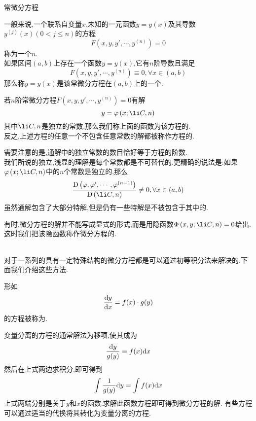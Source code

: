 \documentclass{ctexart}
\begin{document}
\pagestyle{empty}
\begin{center}\large 常微分方程\end{center}
\begin{definition}[1.1 定义:常微分方程]
    一般来说,一个联系自变量$x$,未知的一元函数$y=y(x)$及其导数$y^{(j)}(x)(0<j\leqslant n)$的方程
    \[F\left(x,y,y',\cdots,y^{(n)}\right)=0\]
    称为一个$n$.\\
    如果区间$(a,b)$上存在一个函数$y=y(x)$,它有$n$阶导数且满足
    \[F\left(x,y,y',\cdots,y^{(n)}\right)\equiv0,\forall x\in(a,b)\]
    那么称$y=y(x)$是该常微分方程在$(a,b)$上的一个.
\end{definition}
\begin{definition}[1.2 定义:通解与特解]
    若$n$阶常微分方程$F\left(x,y,y',\cdots,y^{(n)}\right)=0$有解
    \[y=\varphi\left(x;\li C,n\right)\]
    其中$\li C,n$是独立的常数,那么我们称上面的函数为该方程的.\\
    反之,上述方程的任意一个不包含任意常数的解都被称作方程的.
\end{definition}\noindent
需要注意的是,通解中的独立常数的数目恰好等于方程的阶数.\\
我们所说的独立,浅显的理解是每个常数都是不可替代的.更精确的说法是:如果$\varphi\left(x;\li C,n\right)$中的$n$个常数是独立的,那么
\[\dfrac{\text{D}\left(\varphi,\varphi',\cdots,\varphi^{(n-1)}\right)}{\text{D}\left(\li C,n\right)}\neq0,\forall x\in (a,b)\]
虽然通解包含了大部分特解,但是仍有一些特解是不被包含于其中的.
\begin{definition}[1.3 定义:通积分]
    有时,微分方程的解并不能写成显式的形式,而是用隐函数$\Phi\left(x,y;\li C,n\right)=0$给出.这时我们把该隐函数称作微分方程的.
\end{definition}\noindent
{}\\
对于一系列的具有一定特殊结构的微分方程都是可以通过初等积分法来解决的.下面我们介绍这些方法.
\begin{definition}[2.1 变量分离的方程]
    形如
    \[\dfrac{\mathrm{d} y}{\mathrm{d} x}=f(x)\cdot g(y)\]
    的方程被称为.
\end{definition}
变量分离的方程的通常解法为移项,使其成为
\[\dfrac{\mathrm{d} y}{g(y)}=f(x)\mathrm{d} x\]
然后在上式两边求积分,即可得到
\[\int\dfrac{1}{g(y)}\mathrm{d} y=\int{f(x)\mathrm{d}x}\]
上式两端分别是关于$y$和$x$的函数.求解此函数方程即可得到微分方程的解.
有些方程可以通过适当的代换将其转化为变量分离的方程.
\end{document}
